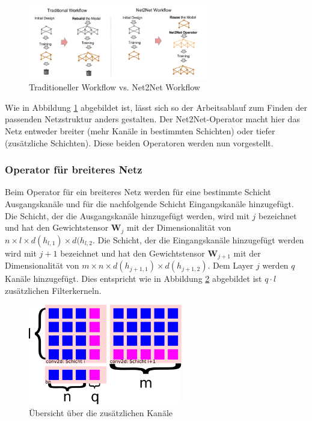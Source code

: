 \begin{figure}[h]
 \centering
 \includegraphics[width=0.7\textwidth]{KapitelPartA/images/net2net.png}
 \caption{Traditioneller Workflow vs. Net2Net Workflow}
 \label{abb:net2net}
\end{figure}


Wie in Abbildung \ref{abb:net2net} abgebildet ist, lässt sich so der Arbeitsablauf zum Finden der passenden Netzstruktur anders gestalten. Der Net2Net-Operator macht hier das Netz entweder breiter (mehr Kanäle in bestimmten Schichten) oder tiefer (zusätzliche Schichten). Diese beiden Operatoren werden nun vorgestellt.

\subsubsection{Operator für breiteres Netz}
Beim Operator für ein breiteres Netz werden für eine bestimmte Schicht Ausgangskanäle und für die nachfolgende Schicht Eingangskanäle hinzugefügt. Die Schicht, der die Ausgangskanäle hinzugefügt werden, wird mit $j$ bezeichnet und hat den Gewichtstensor $\mathbf{W}_j$ mit der Dimensionalität von $n \times l \times d(h_{l,1}) \times d(h_{l,2}$. Die Schicht, der die Eingangskanäle hinzugefügt werden wird mit $j+1$ bezeichnet und hat den Gewichtstensor $\mathbf{W}_{j+1}$ mit der Dimensionalität von $m \times n \times d(h_{j+1,1}) \times d(h_{j+1,2})$. Dem Layer $j$ werden $q$ Kanäle hinzugefügt. Dies entspricht wie in Abbildung \ref{abb:channels} abgebildet ist $q \cdot l $ zusätzlichen Filterkerneln. 
\begin{figure}[h]
 \centering
 \includegraphics[width=0.6\textwidth]{KapitelPartA/images/channels.png}
 \caption{Übersicht über die zusätzlichen Kanäle}
\label{abb:channels}
 \end{figure}



